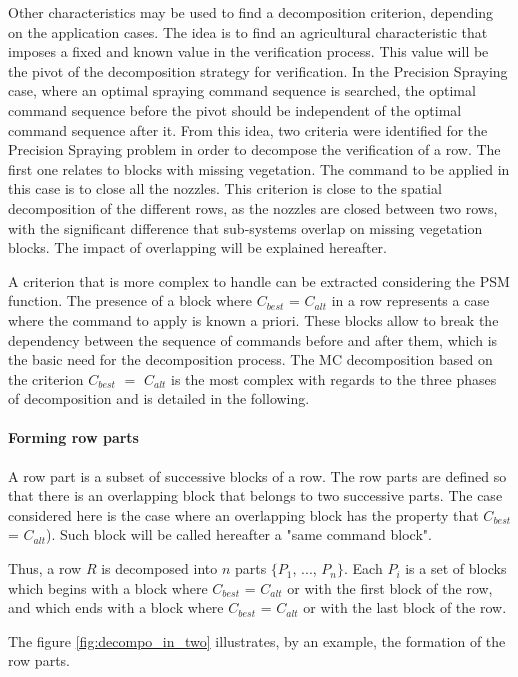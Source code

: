 Other characteristics may be used to find a decomposition criterion, depending on the application cases. The idea is to find an agricultural characteristic that imposes a fixed and known value in the verification process. This value will be the pivot of the decomposition strategy for verification.
In the Precision Spraying case, where an optimal spraying command sequence is searched, the optimal command sequence before the pivot should be independent of the optimal command sequence after it. From this idea, two criteria were identified for the Precision Spraying problem in order to decompose the verification of a row.
The first one relates to blocks with missing vegetation. The command to be applied in this case is to close all the nozzles. This criterion is close to the spatial decomposition of the different rows, as the nozzles are closed between two rows, with the significant difference that sub-systems overlap on missing vegetation blocks. The impact of overlapping will be explained hereafter.

A criterion that is more complex to handle can be extracted considering the PSM function. The presence of a block where $C_{best}$ = $C_{alt}$ in a row represents a case where the command to apply is known a priori. These blocks allow to break the dependency between the sequence of commands before and after them, which is the basic need for the decomposition process. The MC decomposition based on the criterion $C_{best}$ $=$ $C_{alt}$ is the most complex with regards to the three phases of decomposition and is detailed in the following.

\paragraph{\textbf{Forming row parts}} 
A row part is a subset of successive blocks of a row. The row parts are defined so that there is an overlapping block that belongs to two successive parts. The case considered here is the case where an overlapping block has the property that $C_{best}$ = $C_{alt}$). Such block will be called hereafter a "same command block".

Thus, a row $R$ is decomposed into $ n $ parts $ \{P_1$, ..., $P_n\}$. Each $P_i$ is a set of blocks which begins with a block where $C_{best}$ = $C_{alt}$ or with the first block of the row, and which ends with a block where $C_{best}$ = $C_{alt}$ or with the last block of the row.

The figure \ref{fig:decompo_in_two} illustrates, by an example, the formation of the row parts.

